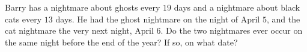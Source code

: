 Barry has a nightmare about ghosts every $19$ days and a nightmare about black cats every $13$ days. He had the ghost nightmare on the night of April $5$, and the cat nightmare the very next night, April $6$. Do the two nightmares ever occur on the same night before the end of the year? If so, on what date?
